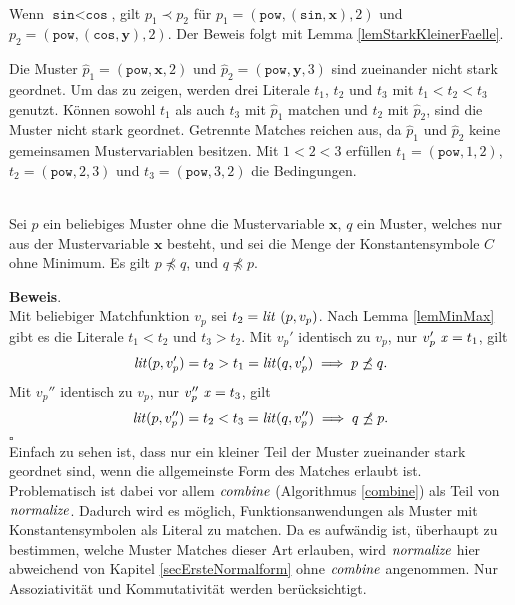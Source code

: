 \begin{beispiel}~\\
Wenn $\texttt{sin} < \texttt{cos}$, gilt $p_1 \prec p_2$ für $p_1 = (\texttt{pow}, (\texttt{sin}, \mathbf x), 2)$ und $p_2 = (\texttt{pow}, (\texttt{cos}, \mathbf y), 2)$. Der Beweis folgt mit Lemma \ref{lemStarkKleinerFaelle}.

Die Muster $\hat p_1 = (\texttt{pow}, \mathbf x, 2)$ und $\hat p_2 = (\texttt{pow}, \mathbf y, 3)$ sind zueinander nicht stark geordnet. 
Um das zu zeigen, werden drei Literale $t_1$, $t_2$ und $t_3$ mit ${t_1 < t_2 < t_3}$ genutzt.
Können sowohl $t_1$ als auch $t_3$ mit $\hat p_1$ matchen und $t_2$ mit $\hat p_2$, sind die Muster nicht stark geordnet. Getrennte Matches reichen aus, da $\hat p_1$ und $\hat p_2$ keine gemeinsamen Mustervariablen besitzen.
 Mit $1 < 2 < 3$ erfüllen $t_1 = (\texttt{pow}, 1, 2)$, $t_2 = (\texttt{pow}, 2, 3)$ und $t_3 = (\texttt{pow}, 3, 2)$ die Bedingungen.
\end{beispiel}

\begin{lemma}~\\
Sei $p$ ein beliebiges Muster ohne die Mustervariable $\mathbf x$, $q$ ein Muster, welches nur aus der Mustervariable $\mathbf x$ besteht, und sei die Menge der Konstantensymbole $C$ ohne Minimum.
Es gilt $p \not\preceq q$, und $q \not\preceq p$.
\end{lemma}

\textbf{Beweis}.\\
Mit beliebiger Matchfunktion $v_p$ sei $t_2 = \mathit{lit}~(p, v_p)$. Nach Lemma \ref{lemMinMax} gibt es die Literale $t_1 < t_2$ und $t_3 > t_2$. 
Mit $v_p'$ identisch zu $v_p$, nur $v_p'~\mathit{x} = t_1$, gilt 
$$\mathit{lit}(p, v_p') = t_2 > t_1 = \mathit{lit}(q, v_p') \implies p \not\preceq q.$$
Mit $v_p''$ identisch zu $v_p$, nur $v_p''~\mathit{x} = t_3$, gilt 
$$\mathit{lit}(p, v_p'') = t_2 < t_3 = \mathit{lit}(q, v_p'') \implies q \not\preceq p.$$
\hfill $\square$\\


Einfach zu sehen ist, dass nur ein kleiner Teil der Muster zueinander stark geordnet sind, wenn die allgemeinste Form des Matches erlaubt ist. Problematisch ist dabei vor allem $\mathit{combine}$ (Algorithmus \ref{combine}) als Teil von $\mathit{normalize}$. Dadurch wird es möglich, Funktionsanwendungen als Muster mit Konstantensymbolen als Literal zu matchen. Da es aufwändig ist, überhaupt zu bestimmen, welche Muster Matches dieser Art erlauben, wird $\mathit{normalize}$ hier abweichend von Kapitel \ref{secErsteNormalform} ohne $\mathit{combine}$ angenommen. Nur Assoziativität und Kommutativität werden berücksichtigt.

